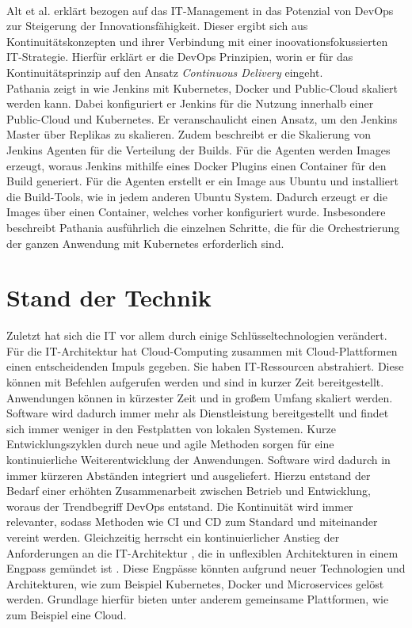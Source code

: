 \medskip
\\
Alt et al. erklärt bezogen auf das IT-Management in \cite{Alt2017} das Potenzial von DevOps zur Steigerung der Innovationsfähigkeit. Dieser ergibt sich aus Kontinuitätskonzepten und ihrer Verbindung mit einer inoovationsfokussierten IT-Strategie. Hierfür erklärt er die DevOps Prinzipien, worin er für das Kontinuitätsprinzip auf den Ansatz \emph{Continuous Delivery} eingeht. 
\medskip
\\
Pathania zeigt in \cite{Pathania2017} wie Jenkins mit Kubernetes, Docker und Public-Cloud skaliert werden kann. Dabei konfiguriert er Jenkins für die Nutzung innerhalb einer Public-Cloud und Kubernetes. Er veranschaulicht einen Ansatz, um den Jenkins Master über Replikas zu skalieren. Zudem beschreibt er die Skalierung von Jenkins Agenten für die Verteilung der Builds. Für die Agenten werden Images erzeugt, woraus Jenkins mithilfe eines Docker Plugins einen Container für den Build generiert. Für die Agenten erstellt er ein Image aus Ubuntu und installiert die Build-Tools, wie in jedem anderen Ubuntu System.
Dadurch erzeugt er die Images über einen Container, welches vorher konfiguriert wurde. Insbesondere beschreibt Pathania ausführlich die einzelnen Schritte, die für die Orchestrierung der ganzen Anwendung mit Kubernetes erforderlich sind.

\section{Stand der Technik}
Zuletzt hat sich die IT vor allem durch einige Schlüsseltechnologien verändert. Für die IT-Architektur hat Cloud-Computing zusammen mit Cloud-Plattformen einen entscheidenden Impuls gegeben. Sie haben IT-Ressourcen abstrahiert. Diese können mit Befehlen aufgerufen werden und sind in kurzer Zeit bereitgestellt. Anwendungen können in kürzester Zeit und in großem Umfang skaliert werden. Software wird dadurch immer mehr als Dienstleistung bereitgestellt und findet sich immer weniger in den Festplatten von lokalen Systemen. Kurze Entwicklungszyklen durch neue und agile Methoden sorgen für eine kontinuierliche Weiterentwicklung der Anwendungen. Software wird dadurch in immer kürzeren Abständen integriert und ausgeliefert. Hierzu entstand der Bedarf einer erhöhten Zusammenarbeit zwischen Betrieb und Entwicklung, woraus der Trendbegriff DevOps entstand. Die Kontinuität wird immer relevanter, sodass Methoden wie \ac{CI} und \ac{CD} zum Standard und miteinander vereint werden. Gleichzeitig herrscht ein kontinuierlicher Anstieg der Anforderungen an die IT-Architektur \cite{Bussmann2006}, die in unflexiblen Architekturen in einem Engpass gemündet ist \cite{Brockhoff2006, Bussmann2006}. Diese Engpässe könnten aufgrund neuer Technologien und Architekturen, wie zum Beispiel Kubernetes, Docker und Microservices gelöst werden. Grundlage hierfür bieten unter anderem gemeinsame Plattformen, wie zum Beispiel eine Cloud.

